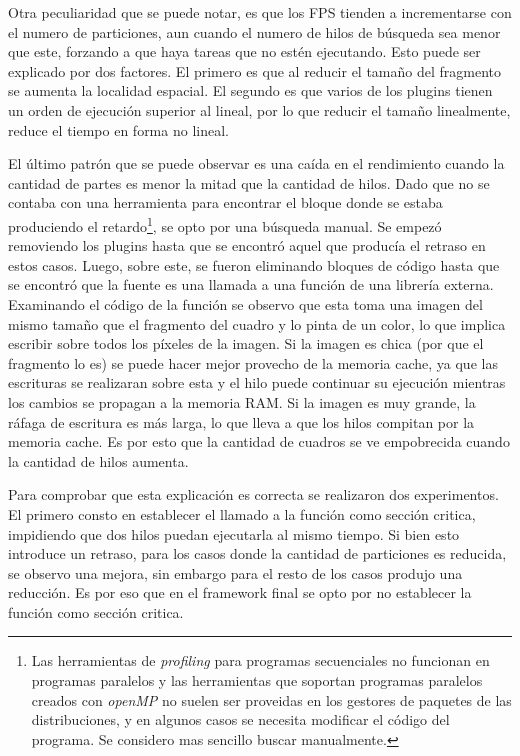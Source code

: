 Otra peculiaridad que se puede notar, es que los FPS tienden a incrementarse con
el numero de particiones, aun cuando el numero de hilos de búsqueda sea menor
que este, forzando a que haya tareas que no estén ejecutando. Esto puede ser
explicado por dos factores. El primero es que al reducir el tamaño del fragmento
se aumenta la localidad espacial. El segundo es que varios de los plugins tienen
un orden de ejecución superior al lineal, por lo que reducir el tamaño
linealmente, reduce el tiempo en forma no lineal.

El último patrón que se puede observar es una caída en el rendimiento cuando la
cantidad de partes es menor la mitad que la cantidad de hilos. Dado que no se
contaba con una herramienta para encontrar el bloque donde se estaba produciendo
el retardo\footnote{Las herramientas de \emph{profiling} para programas
secuenciales no funcionan en programas paralelos y las herramientas que soportan
programas paralelos creados con \emph{openMP} no suelen ser proveidas en los
gestores de paquetes de las distribuciones, y en algunos casos se necesita
modificar el código del programa. Se considero mas sencillo buscar
manualmente.}, se opto por una búsqueda manual. Se empezó removiendo los
plugins hasta que se encontró aquel que producía el retraso en estos casos.
Luego, sobre este, se fueron eliminando bloques de código hasta que se encontró
que la fuente es una llamada a una función de una librería externa. Examinando
el código de la función se observo que esta toma una imagen del mismo tamaño que
el fragmento del cuadro y lo pinta de un color, lo que implica escribir sobre
todos los píxeles de la imagen. Si la imagen es chica (por que el fragmento lo
es) se puede hacer mejor provecho de la memoria cache, ya que las escrituras se
realizaran sobre esta y el hilo puede continuar su ejecución mientras los
cambios se propagan a la memoria RAM. Si la imagen es muy grande, la ráfaga de
escritura es más larga, lo que lleva a que los hilos compitan por la memoria
cache. Es por esto que la cantidad de cuadros se ve empobrecida cuando la
cantidad de hilos aumenta.

Para comprobar que esta explicación es correcta se realizaron dos experimentos.
El primero consto en establecer el llamado a la función como sección critica,
impidiendo que dos hilos puedan ejecutarla al mismo tiempo. Si bien esto
introduce un retraso, para los casos donde la cantidad de particiones es
reducida, se observo una mejora, sin embargo para el resto de los casos produjo
una reducción. Es por eso que en el framework final se opto por no
establecer la función como sección critica.

